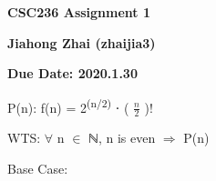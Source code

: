 \documentclass[12pt]{article}
\renewcommand{\_}{\kern-1.5pt\textunderscore\kern-1.5pt}
\begin{document}
\begin{Center}
{\fontsize{16pt}{19.2pt}\selectfont \textbf{CSC236 Assignment 1 }\par}
\end{Center}\par

\begin{Center}
{\fontsize{16pt}{19.2pt}\selectfont \textbf{Jiahong Zhai (zhaijia3)}\par}
\end{Center}\par

\begin{Center}
{\fontsize{16pt}{19.2pt}\selectfont \textbf{Due Date: 2020.1.30}\par}
\end{Center}\par


\vspace{\baselineskip}
\begin{adjustwidth}{0.25in}{0.0in}
{\fontsize{14pt}{16.8pt}\selectfont P(n): f(n) = 2\textsuperscript{(n/2)} ⋅ ( \( \frac{n}{2} \) )!\par}\par

\end{adjustwidth}

\begin{adjustwidth}{0.25in}{0.0in}
{\fontsize{14pt}{16.8pt}\selectfont WTS: $ \forall $  n $ \in $  ℕ, n is even $ \Rightarrow $  P(n)\par}\par

\end{adjustwidth}

\begin{adjustwidth}{0.25in}{0.0in}
{\fontsize{14pt}{16.8pt}\selectfont Base Case:\par}\par

\end{adjustwidth}

\begin{adjustwidth}{0.25in}{0.0in}
\tab {}\par

\end{adjustwidth}

\begin{adjustwidth}{0.25in}{0.0in}
\tab {}\par

\end{adjustwidth}
\end{document}
